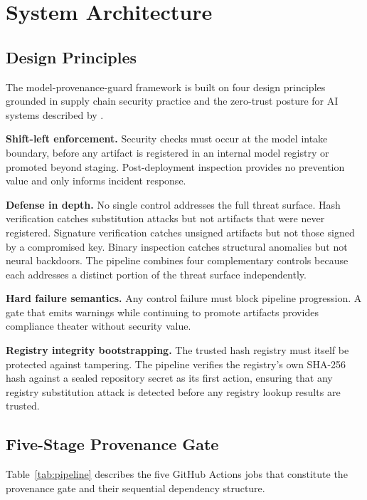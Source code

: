 \documentclass[preprint,12pt,twocolumn]{elsarticle}
\begin{document}
\section{System Architecture}
\label{sec:design}

\subsection{Design Principles}

The model-provenance-guard framework is built on four design principles
grounded in supply chain security practice and the zero-trust posture for
AI systems described by \citet{mudusu2026zerotrust}.

\textbf{Shift-left enforcement.} Security checks must occur at the model
intake boundary, before any artifact is registered in an internal model
registry or promoted beyond staging. Post-deployment inspection provides no
prevention value and only informs incident response.

\textbf{Defense in depth.} No single control addresses the full threat
surface. Hash verification catches substitution attacks but not artifacts
that were never registered. Signature verification catches unsigned
artifacts but not those signed by a compromised key. Binary inspection
catches structural anomalies but not neural backdoors. The pipeline
combines four complementary controls because each addresses a distinct
portion of the threat surface independently.

\textbf{Hard failure semantics.} Any control failure must block pipeline
progression. A gate that emits warnings while continuing to promote
artifacts provides compliance theater without security value.

\textbf{Registry integrity bootstrapping.} The trusted hash registry must
itself be protected against tampering. The pipeline verifies the registry's
own SHA-256 hash against a sealed repository secret as its first action,
ensuring that any registry substitution attack is detected before any
registry lookup results are trusted.

\subsection{Five-Stage Provenance Gate}

Table~\ref{tab:pipeline} describes the five GitHub Actions jobs that
constitute the provenance gate and their sequential dependency structure.
\end{document}

